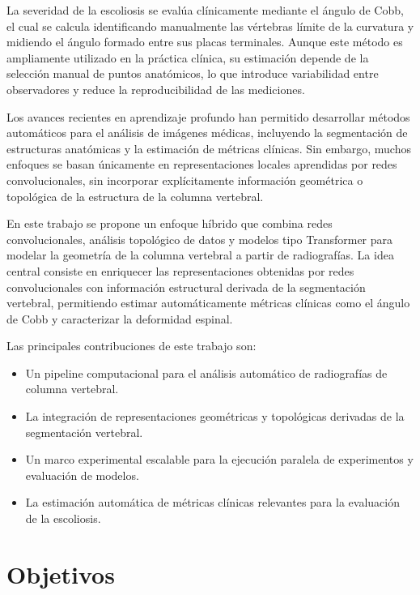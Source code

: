 \documentclass[conference]{IEEEtran}
\begin{document}
La severidad de la escoliosis se evalúa clínicamente mediante el ángulo de Cobb, el cual se calcula identificando manualmente las vértebras límite de la curvatura y midiendo el ángulo formado entre sus placas terminales. Aunque este método es ampliamente utilizado en la práctica clínica, su estimación depende de la selección manual de puntos anatómicos, lo que introduce variabilidad entre observadores y reduce la reproducibilidad de las mediciones.

Los avances recientes en aprendizaje profundo han permitido desarrollar métodos automáticos para el análisis de imágenes médicas, incluyendo la segmentación de estructuras anatómicas y la estimación de métricas clínicas. Sin embargo, muchos enfoques se basan únicamente en representaciones locales aprendidas por redes convolucionales, sin incorporar explícitamente información geométrica o topológica de la estructura de la columna vertebral.

En este trabajo se propone un enfoque híbrido que combina redes convolucionales, análisis topológico de datos y modelos tipo Transformer para modelar la geometría de la columna vertebral a partir de radiografías. La idea central consiste en enriquecer las representaciones obtenidas por redes convolucionales con información estructural derivada de la segmentación vertebral, permitiendo estimar automáticamente métricas clínicas como el ángulo de Cobb y caracterizar la deformidad espinal.

Las principales contribuciones de este trabajo son:

\begin{itemize}

\item Un pipeline computacional para el análisis automático de radiografías de columna vertebral.

\item La integración de representaciones geométricas y topológicas derivadas de la segmentación vertebral.

\item Un marco experimental escalable para la ejecución paralela de experimentos y evaluación de modelos.

\item La estimación automática de métricas clínicas relevantes para la evaluación de la escoliosis.

\end{itemize}

\section{Objetivos}
\end{document}
